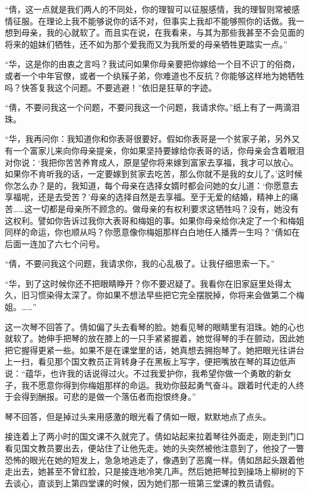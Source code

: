 \par “倩，这一点就是我们两人的不同处，你的理智可以征服感情，我的理智则常被感情征服。在理论上我不能够说你的话不对，但事实上我却不能够照你的话做。我一想到母亲，我的心就软了。而且实在说，在我看来，与其为那些我甚至不会见面的将来的姐妹们牺牲，还不如为那个爱我而又为我所爱的母亲牺牲更踏实一点。”
\par “华，这是你的由衷之言吗？我试问如果你母亲要把你嫁给一个目不识丁的俗商，或者一个中年官僚，或者一个纨豯子弟，你难道也不反抗？你能够这样地为她牺牲吗？快答复我这个问题。不要逃避！”依旧是狂草的字迹。
\par “倩，不要问我这一个问题，不要问我这一个问题，我请求你。”纸上有了一两滴泪珠。
\par “华，我再问你：我知道你和你表哥很要好。假如你表哥是一个贫家子弟，另外又有一个富家儿来向你母亲提亲，你如果坚持要嫁给你表哥的话，你母亲会含着眼泪对你说：‘我把你苦苦养育成人，原是望你将来嫁到富家去享福，我才可以放心。如果你不肯听我的话，一定要嫁到贫家去吃苦，那么你就不是我的女儿了。’这时候你怎么办？是的，我知道，每个母亲在选择女婿时都会问她的女儿道：‘你愿意去享福呢，还是去受苦？’母亲的选择自然是去享福。至于无爱的结婚，精神上的痛苦……这一切都是母亲所不顾念的。做母亲的有权利要求这牺牲吗？没有，她没有这权利。譬如你告诉过我你大表哥和梅姐的事。如果你母亲给你决定了一个和梅姐同样的命运，你也顺从吗？你愿意像你梅姐那样白白地任人播弄一生吗？”倩如在后面一连加了六七个问号。
\par “倩，不要问我这个问题，我请求你，我的心乱极了。让我仔细思索一下。”
\par “华，到了这时候你还不把眼睛睁开？你不要迟疑了。我看你在旧家庭里处得太久，旧习惯染得太深了。你如果不想法早些把它完全摆脱掉，你将来会做第二个梅姐。……”
\par 这一次琴不回答了。倩如偏了头去看琴的脸。她看见琴的眼睛里有泪珠。她的心也就软了。她伸手把琴的放在膝上的一只手紧紧握着，她觉得琴的手在颤动，因此她把它握得更紧一些。如果不是在课堂里的话，她真想去拥抱琴了。她把眼光往讲台上一扫，看见那个国文教员正背转身子在黑板上写字，便把嘴放在琴的耳边低声说：“蕴华，也许我的话说得过火。不过我爱护你，我希望你做一个勇敢的新女子，我不愿意你得到你梅姐那样的命运。我劝你鼓起勇气奋斗。跟着时代走的人终于会得到酬报。可悲的是做一个落伍者而抱恨终身。”
\par 琴不回答，但是掉过头来用感激的眼光看了倩如一眼，默默地点了点头。
\par 接连着上了两小时的国文课不久就完了。倩如站起来拉着琴往外面走，刚走到门口看见国文教员要出去，便站住了让他先走。她的头突然被他注意到了，他投了一瞥恐怖的眼光在她的短发上，急急地逃走了，像遇到了恶魔一样。倩如昂起头跟着他走出去，她甚至不曾红脸，只是接连地冷笑几声。然后她把琴拉到操场上柳树的下去谈心，直谈到上第四堂课的时候，因为她们那一班第三堂课的教员请假。

